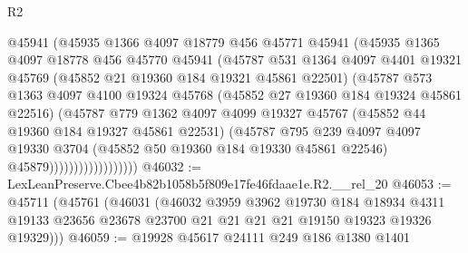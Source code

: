 \begin{lexlean}{R2}
\begin{coremodule}
                            @45941
                            (@45935
                              @1366
                              @4097
                              @18779
                              @456
                              @45771
                              @45941
                              (@45935
                                @1365
                                @4097
                                @18778
                                @456
                                @45770
                                @45941
                                (@45787
                                  @531
                                  @1364
                                  @4097
                                  @4401
                                  @19321
                                  @45769
                                  (@45852 @21 @19360 @184 @19321 @45861 @22501)
                                  (@45787
                                    @573
                                    @1363
                                    @4097
                                    @4100
                                    @19324
                                    @45768
                                    (@45852 @27 @19360 @184 @19324 @45861 @22516)
                                    (@45787
                                      @779
                                      @1362
                                      @4097
                                      @4099
                                      @19327
                                      @45767
                                      (@45852 @44 @19360 @184 @19327 @45861 @22531)
                                      (@45787
                                        @795
                                        @239
                                        @4097
                                        @4097
                                        @19330
                                        @3704
                                        (@45852 @50 @19360 @184 @19330 @45861 @22546)
                                        @45879))))))))))))))))))
@46032 := LexLeanPreserve.Cbee4b82b1058b5f809e17fe46fdaae1e.R2.__rel_20
@46053 := @45711
    (@45761
      (@46031
        (@46032
          @3959
          @3962
          @19730
          @184
          @18934
          @4311
          @19133
          @23656
          @23678
          @23700
          @21
          @21
          @21
          @21
          @19150
          @19323
          @19326
          @19329)))
@46059 := @19928 @45617 @24111 @249 @186 @1380 @1401

\end{coremodule}
\end{lexlean}
